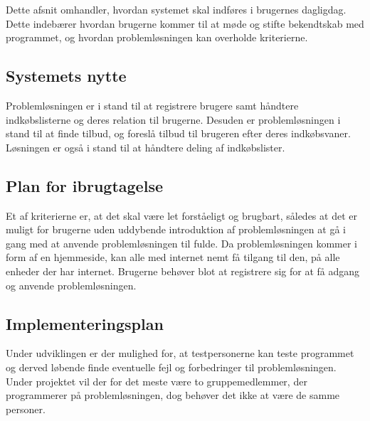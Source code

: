Dette afsnit omhandler, hvordan systemet skal indføres i brugernes dagligdag. Dette indebærer hvordan brugerne kommer til at møde og stifte bekendtskab med programmet, og hvordan problemløsningen kan overholde kriterierne.

\subsection{Systemets nytte}
Problemløsningen er i stand til at registrere brugere samt håndtere indkøbslisterne og deres relation til brugerne. Desuden er problemløsningen i stand til at finde tilbud, og foreslå tilbud til brugeren efter deres indkøbsvaner. Løsningen er også i stand til at håndtere deling af indkøbslister.

\subsection{Plan for ibrugtagelse}
Et af kriterierne er, at det skal være let forståeligt og brugbart, således at det er muligt for brugerne uden uddybende introduktion af problemløsningen at gå i gang med at anvende problemløsningen til fulde.
Da problemløsningen kommer i form af en hjemmeside, kan alle med internet nemt få tilgang til den, på alle enheder der har internet. Brugerne behøver blot at registrere sig for at få adgang og anvende problemløsningen.

\subsection{Implementeringsplan}
Under udviklingen er der mulighed for, at testpersonerne kan teste programmet og derved løbende finde eventuelle fejl og forbedringer til problemløsningen. Under projektet vil der for det meste være to gruppemedlemmer, der programmerer på problemløsningen, dog behøver det ikke at være de samme personer.